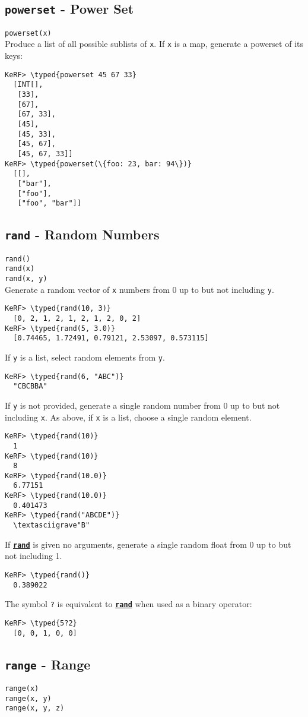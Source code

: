 \documentclass{article}
\newcommand{\typed}[1]{\textcolor{TealBlue}{#1}}
\newcommand{\primdefu}[3]{\subsection{\texttt{#1} - #2}\label{prim:#3}}
\newcommand{\primu}[2]{\hyperref[prim:#2]{\textbf{\texttt{#1}}}}
\newcommand{\primdef}[2]{\primdefu{#1}{#2}{#1}}
\newcommand{\prim}[1]{\primu{#1}{#1}}
\begin{document}
\primdef{powerset}{Power Set}
\texttt{powerset(x)}\\

Produce a list of all possible sublists of \texttt{x}. If \texttt{x} is a map, generate a powerset of its keys:
\begin{Verbatim}
KeRF> \typed{powerset 45 67 33}
  [INT[], 
   [33], 
   [67], 
   [67, 33], 
   [45], 
   [45, 33], 
   [45, 67], 
   [45, 67, 33]]
KeRF> \typed{powerset(\{foo: 23, bar: 94\})}
  [[], 
   ["bar"], 
   ["foo"], 
   ["foo", "bar"]]
\end{Verbatim}

\primdef{rand}{Random Numbers}
\texttt{rand()}\\
\texttt{rand(x)}\\
\texttt{rand(x, y)}\\

Generate a random vector of \texttt{x} numbers from 0 up to but not including \texttt{y}.
\begin{Verbatim}
KeRF> \typed{rand(10, 3)}
  [0, 2, 1, 2, 1, 2, 1, 2, 0, 2]
KeRF> \typed{rand(5, 3.0)}
  [0.74465, 1.72491, 0.79121, 2.53097, 0.573115]
\end{Verbatim}

If \texttt{y} is a list, select random elements from \texttt{y}.
\begin{Verbatim}
KeRF> \typed{rand(6, "ABC")}
  "CBCBBA"
\end{Verbatim}

\pagebreak
If \texttt{y} is not provided, generate a single random number from 0 up to but not including \texttt{x}. As above, if \texttt{x} is a list, choose a single random element.
\begin{Verbatim}
KeRF> \typed{rand(10)}
  1
KeRF> \typed{rand(10)}
  8
KeRF> \typed{rand(10.0)}
  6.77151
KeRF> \typed{rand(10.0)}
  0.401473
KeRF> \typed{rand("ABCDE")}
  \textasciigrave"B"
\end{Verbatim}

If \prim{rand} is given no arguments, generate a single random float from 0 up to but not including 1.
\begin{Verbatim}
KeRF> \typed{rand()}
  0.389022
\end{Verbatim}

The symbol \texttt{?} is equivalent to \prim{rand} when used as a binary operator:
\begin{Verbatim}
KeRF> \typed{5?2}
  [0, 0, 1, 0, 0]
\end{Verbatim}

\primdef{range}{Range}
\texttt{range(x)}\\
\texttt{range(x, y)}\\
\texttt{range(x, y, z)}\\
\end{document}
